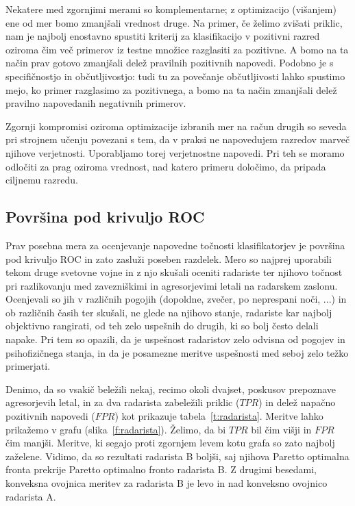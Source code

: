 Nekatere med zgornjimi merami so komplementarne; z optimizacijo (višanjem) ene od mer bomo zmanjšali vrednost druge. Na primer, če želimo zvišati priklic, nam je najbolj enostavno spustiti kriterij za klasifikacijo v pozitivni razred oziroma čim več primerov iz testne množice razglasiti za pozitivne. A bomo na ta način prav gotovo zmanjšali delež pravilnih pozitivnih napovedi. Podobno je s specifičnostjo in občutljivostjo: tudi tu za povečanje občutljivosti lahko spustimo mejo, ko primer razglasimo za pozitivnega, a bomo na ta način zmanjšali delež pravilno napovedanih negativnih primerov.

Zgornji kompromisi oziroma optimizacije izbranih mer na račun drugih so seveda pri strojnem učenju povezani s tem, da v praksi ne napovedujem razredov marveč njihove verjetnosti. Uporabljamo torej verjetnostne napovedi. Pri teh se moramo odločiti za prag oziroma vrednost, nad katero primeru določimo, da pripada ciljnemu razredu.

\subsection{Površina pod krivuljo ROC}

Prav posebna mera za ocenjevanje napovedne točnosti klasifikatorjev je površina pod krivuljo ROC  in zato zasluži poseben razdelek. Mero so najprej uporabili tekom druge svetovne vojne in z njo skušali oceniti radariste ter njihovo točnost pri razlikovanju med zavezniškimi in agresorjevimi letali na radarskem zaslonu. Ocenjevali so jih v različnih pogojih (dopoldne, zvečer, po neprespani noči, ...) in ob različnih časih ter skušali, ne glede na njihovo stanje, radariste kar najbolj objektivno rangirati, od teh zelo uspešnih do drugih, ki so bolj često delali napake. Pri tem so opazili, da je uspešnost radaristov zelo odvisna od pogojev in psihofizičnega stanja, in da je posamezne meritve uspešnosti med seboj zelo težko primerjati.

Denimo, da so vsakič beležili nekaj, recimo okoli dvajset, poskusov prepoznave agresorjevih letal, in za dva radarista zabeležili priklic ($TPR$) in delež napačno pozitivnih napovedi ($FPR$) kot prikazuje tabela~\ref{t:radarista}. Meritve lahko prikažemo v grafu (slika~\ref{f:radarista}). Želimo, da bi $TPR$ bil čim višji in $FPR$ čim manjši. Meritve, ki segajo proti zgornjem levem kotu grafa so zato najbolj zaželene. Vidimo, da so rezultati radarista B boljši, saj njihova Paretto optimalna fronta prekrije Paretto optimalno fronto radarista B. Z drugimi besedami, konveksna ovojnica meritev za radarista B je levo in nad konveksno ovojnico radarista A.

